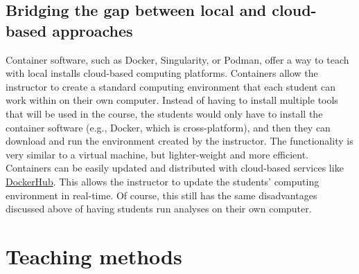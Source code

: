 \subsection{Bridging the gap between local and cloud-based approaches}

Container software, such as
Docker,
Singularity,
or
Podman,
offer a way to  teach with local installs 
cloud-based computing platforms.
Containers allow the instructor to create a standard computing environment that
each student can work within on their own computer.
Instead of having to install multiple tools that will be used in the course,
the students would only have to install the container software (e.g., Docker,
which is cross-platform), and then they can download and run the environment
created by the instructor.
The functionality is very similar to a virtual machine, but lighter-weight and
more efficient.
Containers can be easily updated and distributed with cloud-based
services like
\href{https://hub.docker.com/}{DockerHub}.
This allows the instructor to update the students' computing environment in
real-time.
Of course, this still has the same disadvantages discussed above of having
students run analyses on their own computer.

\section{Teaching methods}


